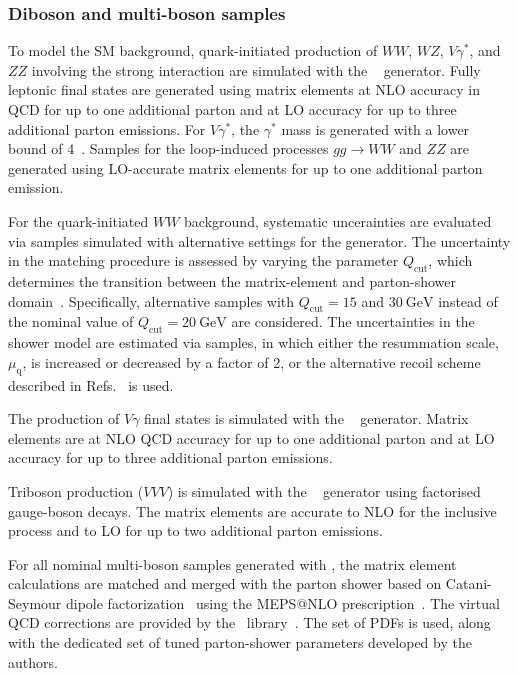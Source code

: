 \subsubsection{Diboson and multi-boson samples}

To model the SM background, quark-initiated production of $WW$, $WZ$, $V\gamma^{\ast}$, and $ZZ$ involving the strong interaction are simulated with the ~\cite{Bothmann:2019yzt} generator.
Fully leptonic final states are generated using matrix elements at NLO accuracy in QCD for up to one additional parton and at LO accuracy for up to three additional parton emissions.
For $V\gamma^{\ast}$, the $\gamma^{\ast}$ mass is generated with a lower bound of 4~\GeV.
Samples for the loop-induced processes $gg \to WW$ and $ZZ$ are generated using LO-accurate matrix elements for up to one additional parton emission.

For the quark-initiated $WW$ background, systematic uncerainties are evaluated
via samples simulated with alternative settings for the 
generator. The uncertainty in the matching procedure is assessed by varying the
parameter $Q_\text{cut}$, which determines the transition between the matrix-element
and parton-shower domain~\cite{Hoeche:2009rj}. Specifically, alternative
samples with $Q_\text{cut}=15$ and $\SI{30}{\GeV}$ instead of the nominal value of
$Q_\text{cut}=\SI{20}{\GeV}$ are considered. The uncertainties in the shower
model are estimated via samples, in which either the resummation scale,
$\mu_\text{q}$, is increased or decreased by a factor of 2, or the alternative
recoil scheme described in Refs.~\cite{Schumann:2007mg,Hoeche:2009xc} is used.

The production of $V\gamma$ final states is simulated with the ~\cite{Bothmann:2019yzt} generator.
Matrix elements are at NLO QCD accuracy for up to one additional parton and at LO accuracy for up to three additional parton emissions.

Triboson production ($VVV$) is simulated with the
~\cite{Bothmann:2019yzt} generator using factorised gauge-boson
decays. The matrix elements are accurate to NLO for the inclusive process and
to LO for up to two additional parton emissions.

For all nominal multi-boson samples generated with \SHERPA, the matrix element calculations are matched and merged with the \SHERPA parton shower based on Catani-Seymour dipole factorization~\cite{Gleisberg:2008fv,Schumann:2007mg} using the MEPS@NLO prescription~\cite{Hoeche:2011fd,Hoeche:2012yf,Catani:2001cc,Hoeche:2009rj}.
The virtual QCD corrections are provided by the \openloops\ library~\cite{Cascioli:2011va,Denner:2016kdg}.
The \nnpdfnnlo set of PDFs is used, along with the dedicated set of tuned parton-shower parameters developed by the \SHERPA authors.


